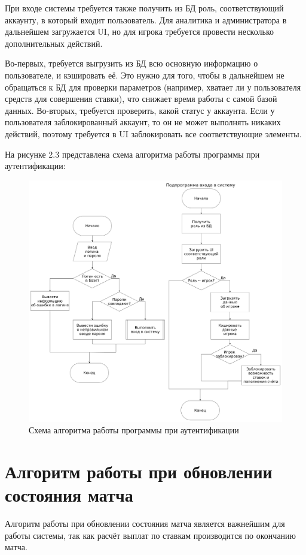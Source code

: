 При входе системы требуется также получить из БД роль, соответствующий аккаунту, в который входит пользователь.
Для аналитика и администратора в дальнейшем загружается UI, но для игрока требуется провести несколько дополнительных действий.

Во-первых, требуется выгрузить из БД всю основную информацию о пользователе, и кэшировать её.
Это нужно для того, чтобы в дальнейшем не обращаться к БД для проверки параметров (например, хватает ли у пользователя средств для совершения ставки), что снижает время работы с самой базой данных.
Во-вторых, требуется проверить, какой статус у аккаунта. 
Если у пользователя заблокированный аккаунт, то он не может выполнять никаких действий, поэтому требуется в UI заблокировать все соответствующие элементы.

На рисунке 2.3 представлена схема алгоритма работы программы при аутентификации:
\FloatBarrier
\begin{figure}[hp]	
	\begin{center}
		\includegraphics[width=\linewidth]{inc/auth.png}
	\end{center}
	\caption{Схема алгоритма работы программы при аутентификации}
	\label{fig::auth}
\end{figure}
\FloatBarrier

\section{Алгоритм работы при обновлении состояния матча}
Алгоритм работы при обновлении состояния матча является важнейшим для работы системы, так как расчёт выплат по ставкам производится по окончанию матча.

